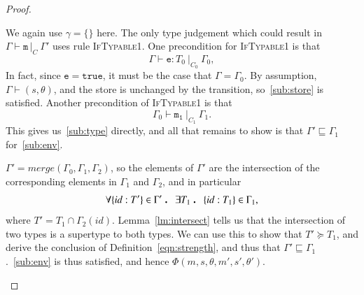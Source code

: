\documentclass[12pt,a4paper,twoside,openright]{report}
\theoremstyle{definition}
\theoremstyle{dotless}
\newcommand*{\orig}{\ensuremath{\!\multimapinv\!}}
\newcommand{\myinfer}[3]{%
  $\infer[\footnotesize\textsc{#1}]
  {#2}{
	{
	  \renewcommand{\arraystretch}{0.9}
	  \begin{tabular}{>{$}c<{$}}
		#3	
	  \end{tabular}
	}
  }$
}
\newcommand{\infertable}[1]{%
  \begin{table}[H]
  	\centerline{
  	  \begin{adjustbox}{max width=\linewidth,center}
	  	\begin{tabular}{c c}
		  #1
	  	\end{tabular}%
  	  \end{adjustbox}
  	}
  \end{table}
}
\newcommand{\typable}[2][ ]{\Gamma{}\vdash\mathtt{#2}\, |_C#1\:\Gamma#1'}
\newcommand{\transition}[6]{\langle{}\mathtt{#1},#2,#3\rangle{}\rightarrow{}\langle{}\mathtt{#4},#5,#6\rangle}
\newcommand\qdot{\mathbin{\scalebox{1.5}{.}}\enspace}
\begin{document}
\begin{proof}
\begin{case}[If2]
	We again use $\gamma=\{\}$ here. The only type judgement which could result in $\typable{m}$ uses rule
	\textsc{IfTypable1}. One precondition for \textsc{IfTypable1} is that
	$$\Gamma\vdash\mathtt{e}:T_0\ |_{C_0}\ \Gamma_0,$$ 
	In fact, since $\mathtt{e} = \mathtt{true}$, it must be the case that $\Gamma=\Gamma_0$.
	By assumption, $\Gamma\vdash(s,\theta)$, and the store is unchanged by the transition, so~\eqref{sub:store}
	is satisfied. Another precondition of \textsc{IfTypable1} is that 
	$$\Gamma_0\vdash\mathtt{m_1}\ |_{C_1}\ \Gamma_1.$$
	This gives us~\eqref{sub:type} directly, and all that remains to show is
	that $\Gamma'\sqsubseteq \Gamma_1$ for~\eqref{sub:env}.

	$\Gamma'=merge(\Gamma_0,\Gamma_1,\Gamma_2)$, so the elements of $\Gamma'$
	are the intersection of the corresponding elements in $\Gamma_1$ and
	$\Gamma_2$, and in particular 
	$$\forall \{id:T'\}\in\Gamma'\qdot \exists T_1 \qdot \{id:T_1\}\in\Gamma_1,$$
   	where $T' =	T_1\cap\Gamma_2(id)$. Lemma~\ref{lm:intersect} tells us that the
	intersection of two types is a supertype to both types. We can use this to
	show that $T'\succeq T_1$, and 
	derive the conclusion of Definition~\ref{eqn:strength}, and thus that
	$\Gamma'\sqsubseteq\Gamma_1$.~\eqref{sub:env} is thus satisfied, and hence
	$\Phi(m,s,\theta,m',s',\theta')$.

  \end{case}
  \vfill
\end{proof}
\end{document}
